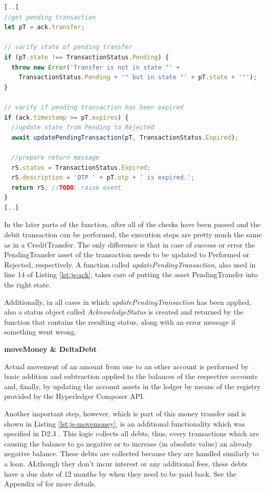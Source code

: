 \begin{center}
\begin{minipage}{0.8\textwidth}
\small
\begin{lstlisting}[language=javascript,firstnumber=1,caption={\bf\small RequestDebitAcknowledge JavaScript excerpt}, captionpos=b,label=lst:js-ack]
[..]
//get pending transaction
let pT = ack.transfer;

// varify state of pending transfer
if (pT.state !== TransactionStatus.Pending) {
  throw new Error('Transfer is not in state "' +
    TransactionStatus.Pending + '" but in state "' + pT.state + '"');
}

// varify if pending transaction has been expired
if (ack.timestamp >= pT.expires) {
  //update state from Pending to Rejected
  await updatePendingTransaction(pT, TransactionStatus.Expired);

  //prepare return message
  rS.status = TransactionStatus.Expired;
  rS.description = 'OTP ' + pT.otp + ' is expired.';
  return rS; //TODO: raise event
}
[..]
\end{lstlisting}
\end{minipage}
\end{center}

In the later parts of the function, after all of the checks have been passed and the debit transaction can be performed, the execution steps are pretty much the same as in a CreditTransfer. The only difference is that in case of success or error the PendingTransfer asset of the transaction needs to be updated to Performed or Rejected, respectively. A function called \textit{updatePendingTransaction}, also used in line 14 of Listing \ref{lst:js-ack}, takes care of putting the asset PendingTransfer into the right state.

Additionally, in all cases in which \textit{updatePendingTransaction} has been applied, also a status object called \textit{AcknowledgeStatus} is created and returned by the function that contains the resulting status, along with an error message if something went wrong.

\textbf{moveMoney \& DeltaDebt}

Actual movement of an amount from one to an other account is performed by basic addition and subtraction applied to the balances of the respective accounts and, finally, by updating the account assets in the ledger by means of the registry provided by the Hyperledger Composer API.

Another important step, however, which is part of this money transfer and is shown in Listing \ref{lst:js-movemoney}, is an additional functionality which was specified in D2.3 \cite{INTERLACE_D23}. This logic collects all debts, thus, every transactions which are causing the balance to go negative or to increase (in absolute value) an already negative balance. These debts are collected because they are handled similarly to a loan. ALthough they don't incur interest or any additional fees, these debts have a due date of 12 months by when they need to be paid back. See the Appendix of \cite{INTERLACE_D23} for more details.

